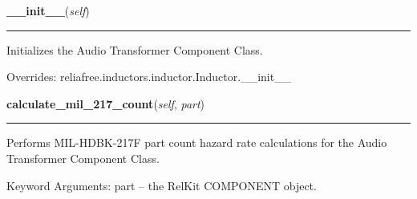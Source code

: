 \hspace{.8\funcindent}\begin{boxedminipage}{\funcwidth}

    \raggedright \textbf{\_\_init\_\_}(\textit{self})

    \vspace{-1.5ex}

    \rule{\textwidth}{0.5\fboxrule}
\setlength{\parskip}{2ex}
    Initializes the Audio Transformer Component Class.

\setlength{\parskip}{1ex}
      Overrides: reliafree.inductors.inductor.Inductor.\_\_init\_\_

    \end{boxedminipage}

    \label{reliafree:inductors:transformer:Audio:calculate_mil_217_count}

    \vspace{0.5ex}

\hspace{.8\funcindent}\begin{boxedminipage}{\funcwidth}

    \raggedright \textbf{calculate\_mil\_217\_count}(\textit{self}, \textit{part})

    \vspace{-1.5ex}

    \rule{\textwidth}{0.5\fboxrule}
\setlength{\parskip}{2ex}
    Performs MIL-HDBK-217F part count hazard rate calculations for the 
    Audio Transformer Component Class.

    Keyword Arguments: part -- the RelKit COMPONENT object.

\setlength{\parskip}{1ex}
    \end{boxedminipage}

    \label{reliafree:inductors:transformer:Audio:calculate_mil_217_stress}

    \vspace{0.5ex}


